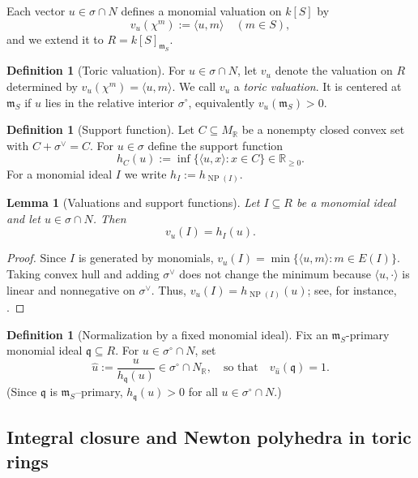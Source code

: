 \documentclass[12pt]{amsart}
\newcommand{\kk}{k}
\newcommand{\RR}{\mathbb{R}}
\newcommand{\m}{\mathfrak m}
\newcommand{\q}{\mathfrak q}
\newcommand{\ip}[2]{{\langle #1,#2\rangle}}
\DeclareMathOperator{\NP}{NP}
\theoremstyle{plain}
\newtheorem{lemma}[theorem]{Lemma}
\theoremstyle{definition}
\newtheorem{definition}[theorem]{Definition}
\numberwithin{equation}{section}
\begin{document}
Each vector $u\in \sigma\cap N$ defines a monomial valuation on $\kk[S]$ by
\[
v_u(\chi^m):=\ip{u}{m} \quad (m\in S),
\]
and we extend it to $R=\kk[S]_{\m_S}$.

\begin{definition}[Toric valuation]\label{def:toric-valuation}
	For $u\in \sigma\cap N$, let $v_u$ denote the valuation on $R$ determined by
	$v_u(\chi^m)=\ip{u}{m}$. We call $v_u$ a \emph{toric valuation}.
	It is centered at $\m_S$ if $u$ lies in the relative interior $\sigma^\circ$,
	equivalently $v_u(\m_S)>0$.
\end{definition}

\begin{definition}[Support function]\label{def:support}
	Let $C\subseteq M_\RR$ be a nonempty closed convex set with $C+\sigma^\vee=C$.
	For $u\in\sigma$ define the support function
	\[
	h_C(u):=\inf\{\ip{u}{x}: x\in C\}\in\RR_{\ge 0}.
	\]
	For a monomial ideal $I$ we write $h_I:=h_{\NP(I)}$.
\end{definition}

\begin{lemma}[Valuations and support functions]\label{lem:val-support}
	Let $I\subseteq R$ be a monomial ideal and let $u\in\sigma\cap N$. Then
	\[
	v_u(I)=h_I(u).
	\]
\end{lemma}

\begin{proof}
	Since $I$ is generated by monomials, $v_u(I)=\min\{\langle u,m\rangle: m\in E(I)\}$.
	Taking convex hull and adding $\sigma^\vee$ does not change the minimum because $\langle u,\cdot\rangle$ is linear and nonnegative on $\sigma^\vee$.
	Thus, $v_u(I)=h_{\NP(I)}(u)$; see, for instance, \cite{CLS}.
\end{proof}



\begin{definition}[Normalization by a fixed monomial ideal]\label{def:normalize-q}
	Fix an $\m_S$-primary monomial ideal $\q\subseteq R$.
	For $u\in\sigma^\circ\cap N$, set
	\[
	\widehat u := \frac{u}{h_{\q}(u)}\in\sigma^\circ\cap N_\RR,
	\quad\text{so that}\quad
	v_{\widehat u}(\q)=1.
	\]
	(Since $\q$ is $\m_S$--primary, $h_{\q}(u) > 0$ for all $u \in \sigma^\circ \cap N$.)
\end{definition}

\subsection{Integral closure and Newton polyhedra in toric rings}
\end{document}
